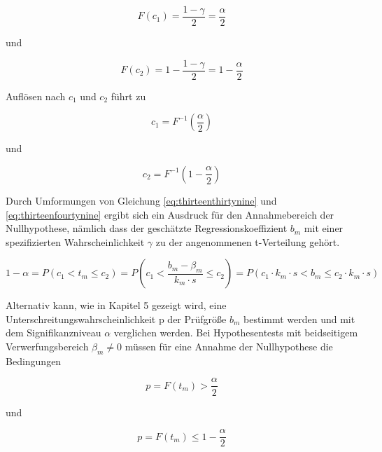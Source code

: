\begin{equation}\label{eq:thirteenfiftyone}
F(c_{1})=\frac{1-\gamma }{2} =\frac{\alpha }{2}
\end{equation}

\noindent und

\begin{equation}\label{eq:thirteenfiftytwo}
F(c_{2})=1-\frac{1-\gamma }{2} =1-\frac{\alpha }{2}
\end{equation}

\noindent Aufl\"{o}sen nach $c_{1}$ und $c_{2}$ f\"{u}hrt zu

\begin{equation}\label{eq:thirteenfiftythree}
c_{1} =F^{-1} \left(\frac{\alpha }{2} \right)
\end{equation}

\noindent und

\begin{equation}\label{eq:thirteenfiftyfour}
c_{2} =F^{-1} \left(1-\frac{\alpha }{2} \right)
\end{equation}

\noindent Durch Umformungen von Gleichung \eqref{eq:thirteenthirtynine} und \eqref{eq:thirteenfourtynine} ergibt sich ein Ausdruck f\"{u}r den Annahmebereich der Nullhypothese, n\"{a}mlich dass der gesch\"{a}tzte Regressionskoeffizient $b_{m}$ mit einer spezifizierten Wahrscheinlichkeit $\gamma$ zu der angenommenen t-Verteilung geh\"{o}rt. 

\begin{equation}\label{eq:thirteenfiftyfive}
1-\alpha =P\left(c_{1} <t_{m} \le c_{2} \right)=P\left(c_{1} <\frac{b_{m} -\beta _{m} }{k_{m} \cdot s} \le c_{2} \right)=P\left(c_{1} \cdot k_{m} \cdot s<b_{m} \le c_{2} \cdot k_{m} \cdot s\right)
\end{equation}

\noindent Alternativ kann, wie in Kapitel 5 gezeigt wird, eine Unterschreitungswahrscheinlichkeit p der Pr\"{u}fgr\"{o}{\ss}e $b_{m}$ bestimmt werden und mit dem Signifikanzniveau $\alpha$ verglichen werden. Bei Hypothesentests mit beidseitigem Verwerfungsbereich $\beta_{m} \neq 0$ m\"{u}ssen f\"{u}r eine Annahme der Nullhypothese die Bedingungen

\begin{equation}\label{eq:thirteenfiftysix}
p=F\left(t_{m} \right)>\frac{\alpha }{2}
\end{equation}

\noindent und

\begin{equation}\label{eq:thirteenfiftyseven}
p=F(t_{m})\le 1-\frac{\alpha }{2}
\end{equation}

